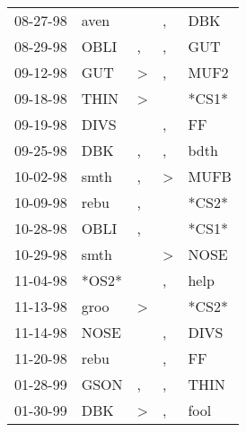 \begin{supertabular}{p{0.07\textwidth}p{0.06\textwidth}p{0.02\textwidth}p{0.02\textwidth}p{0.06\textwidth}}
 08-27-98\textsuperscript{} &  aven\textsuperscript{} &                  &             , &   DBK\textsuperscript{} \\
 08-29-98\textsuperscript{} &  OBLI\textsuperscript{} &                , &             , &   GUT\textsuperscript{} \\
 09-12-98\textsuperscript{} &   GUT\textsuperscript{} &     \textgreater &             , &  MUF2\textsuperscript{} \\
 09-18-98\textsuperscript{} &  THIN\textsuperscript{} &     \textgreater &               &                   *CS1* \\
 09-19-98\textsuperscript{} &  DIVS\textsuperscript{} &                  &             , &    FF\textsuperscript{} \\
 09-25-98\textsuperscript{} &   DBK\textsuperscript{} &                , &             , &  bdth\textsuperscript{} \\
 10-02-98\textsuperscript{} &  smth\textsuperscript{} &                , &  \textgreater &  MUFB\textsuperscript{} \\
 10-09-98\textsuperscript{} &  rebu\textsuperscript{} &                , &               &                   *CS2* \\
 10-28-98\textsuperscript{} &  OBLI\textsuperscript{} &                , &               &                   *CS1* \\
 10-29-98\textsuperscript{} &  smth\textsuperscript{} &                  &  \textgreater &  NOSE\textsuperscript{} \\
 11-04-98\textsuperscript{} &                   *OS2* &                  &             , &  help\textsuperscript{} \\
 11-13-98\textsuperscript{} &  groo\textsuperscript{} &     \textgreater &               &                   *CS2* \\
 11-14-98\textsuperscript{} &  NOSE\textsuperscript{} &                  &             , &  DIVS\textsuperscript{} \\
 11-20-98\textsuperscript{} &  rebu\textsuperscript{} &                  &             , &    FF\textsuperscript{} \\
 01-28-99\textsuperscript{} &  GSON\textsuperscript{} &                , &             , &  THIN\textsuperscript{} \\
 01-30-99\textsuperscript{} &   DBK\textsuperscript{} &     \textgreater &             , &  fool\textsuperscript{} \\

\end{supertabular}
